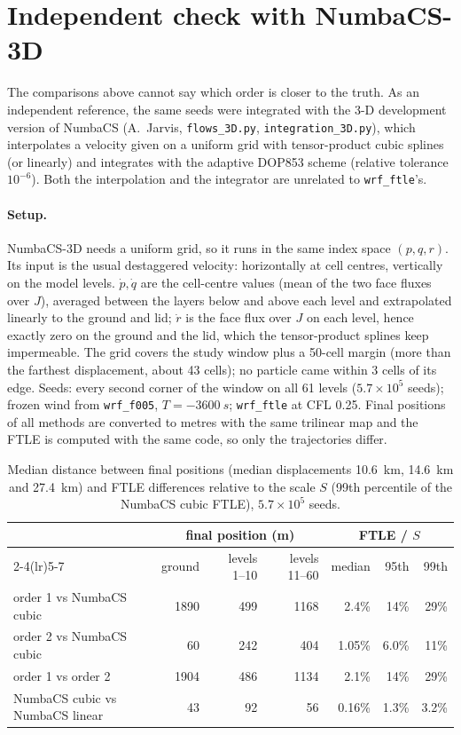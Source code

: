 \documentclass[11pt,a4paper]{article}
\begin{document}
\section{Independent check with NumbaCS-3D}

The comparisons above cannot say which order is closer to the truth. As an
independent reference, the same seeds were integrated with the 3-D
development version of NumbaCS (A.~Jarvis, \texttt{flows\_3D.py},
\texttt{integration\_3D.py}), which interpolates a velocity given on a
uniform grid with tensor-product cubic splines (or linearly) and integrates
with the adaptive DOP853 scheme (relative tolerance $10^{-6}$). Both the
interpolation and the integrator are unrelated to \texttt{wrf\_ftle}'s.

\paragraph{Setup.} NumbaCS-3D needs a uniform grid, so it runs in the same
index space $(p,q,r)$. Its input is the usual destaggered velocity:
horizontally at cell centres, vertically on the model levels. $\dot p,\dot q$
are the cell-centre values (mean of the two face fluxes over $J$), averaged
between the layers below and above each level and extrapolated linearly to
the ground and lid; $\dot r$ is the face flux over $J$ on each level, hence
exactly zero on the ground and the lid, which the tensor-product splines keep
impermeable. The grid covers the study window plus a 50-cell margin (more than
the farthest displacement, about 43 cells); no particle came within 3 cells of
its edge. Seeds: every second corner of the window on all 61 levels
($5.7\times10^5$ seeds); frozen wind from \texttt{wrf\_f005}, $T=\SI{-3600}{s}$;
\texttt{wrf\_ftle} at CFL 0.25. Final positions of all methods are converted to
metres with the same trilinear map and the FTLE is computed with the same code,
so only the trajectories differ.

\begin{table}[t]
  \centering
  \caption{Median distance between final positions (median displacements
  \SI{10.6}{km}, \SI{14.6}{km} and \SI{27.4}{km}) and FTLE differences relative to
  the scale $S$ (99th percentile of the NumbaCS cubic FTLE), $5.7\times10^5$ seeds.}
  \label{tab:numbacs}
  \small
  \begin{tabular}{lrrrrrr}
    \toprule
     & \multicolumn{3}{c}{final position (m)} & \multicolumn{3}{c}{FTLE / $S$} \\
    \cmidrule(lr){2-4}\cmidrule(lr){5-7}
     & ground & levels 1--10 & levels 11--60 & median & 95th & 99th \\
    \midrule
    order 1 vs NumbaCS cubic          & 1890 & 499 & 1168 & 2.4\%  & 14\%  & 29\% \\
    order 2 vs NumbaCS cubic          & 60   & 242 & 404  & 1.05\% & 6.0\% & 11\% \\
    order 1 vs order 2                & 1904 & 486 & 1134 & 2.1\%  & 14\%  & 29\% \\
    NumbaCS cubic vs NumbaCS linear   & 43   & 92  & 56   & 0.16\% & 1.3\% & 3.2\% \\
    \bottomrule
  \end{tabular}
\end{table}
\end{document}

